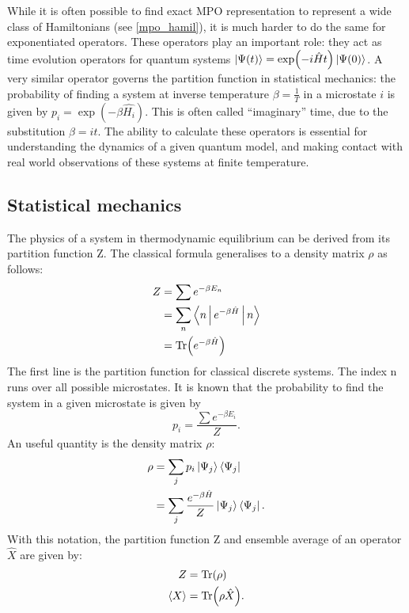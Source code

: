 
While it is often possible to find exact \Gls{MPO} representation to represent a wide class of Hamiltonians (see \cref{mpo_hamil}), it is much harder to do the same for exponentiated operators. These operators play an important role: they act as time evolution operators for quantum systems $ \ket{\Psi(t)} = \exp( -i \hat{H} t ) \ket{\Psi(0)}$. A very similar operator governs the partition function in statistical mechanics: the probability of finding a system at inverse temperature $\beta = \frac{1}{T}$ in a microstate $i$ is given by $p_i = \exp(  - \beta \hat{H_i} )$. This is often called “imaginary” time, due to the substitution $\beta = i t$. The ability to calculate these operators is essential for understanding the dynamics of a given quantum model, and making contact with real world observations of these systems at finite temperature.

\subsection{Statistical mechanics}\label{subsec:statmech}

The physics of a system in thermodynamic equilibrium can be derived from its partition function Z. The classical formula generalises to a density matrix $\rho$ as follows:
\begin{equation}
    \begin{split}
        Z &= \sum e^{ - \beta E_n} \\
        &= \sum_n \Braket{n | e^{ - \beta \hat{H} }  | n} \\
        &= \Tr( e^{ - \beta \hat{H} } )
    \end{split}
\end{equation}
The first line is the partition function for classical discrete systems. The index n runs over all possible microstates. It is known that the probability to find the system in a given microstate is given by
\begin{equation}
    p_i = \frac{\sum e^{ - \beta E_i}}{Z} .
\end{equation}
An useful quantity is the density matrix $\rho$:
\begin{equation}
    \begin{split}
        \rho &= \sum_j p_i  \Ket{ \Psi_j} \Bra{\Psi_j}   \\
        &= \sum_j \frac{ e^{ - \beta \hat{H} } }{Z}  \Ket{ \Psi_j} \Bra{\Psi_j} .
    \end{split}
\end{equation}
With this notation, the partition function Z and ensemble average of an operator $\hat{X}$ are given by:
\begin{equation}
    \begin{split}
        Z &= \Tr( \rho) \\
        \Braket{X} &= \Tr(\rho \hat{X}) .
    \end{split}
\end{equation}

